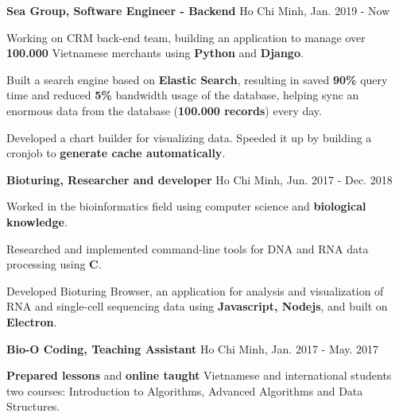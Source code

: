 

\begin{cventries}

  \cvsimpleentry
    {\textbf{Sea Group, Software Engineer - Backend}} %
    {Ho Chi Minh, Jan. 2019 - Now} %
    {
      \begin{cvitems} %
        \item {Working on CRM back-end team, building an application to manage over \textbf{100.000} Vietnamese merchants using \textbf{Python} and \textbf{Django}.}
        \item {Built a search engine based on \textbf{Elastic Search}, resulting in saved \textbf{90\%} query time and reduced \textbf{5\%} bandwidth usage of the database, helping sync an enormous data from the database (\textbf{100.000 records}) every day.}
        \item {Developed a chart builder for visualizing data. Speeded it up by building a cronjob to \textbf{generate cache automatically}.}
      \end{cvitems}
    }

  \cvsimpleentry
    {\textbf{Bioturing, Researcher and developer}} %
    {Ho Chi Minh, Jun. 2017 - Dec. 2018} %
    {
      \begin{cvitems} %
        \item {Worked in the bioinformatics field using computer science and \textbf{biological knowledge}.}
        \item {Researched and implemented command-line tools for DNA and RNA data processing using \textbf{C}.}
        \item {Developed Bioturing Browser, an application for analysis and visualization of RNA and single-cell sequencing data using \textbf{Javascript, Nodejs}, and built on \textbf{Electron}.}
      \end{cvitems}
    }

  \cvsimpleentry
    {\textbf{Bio-O Coding, Teaching Assistant}} %
    {Ho Chi Minh, Jan. 2017 - May. 2017} %
    {
      \begin{cvitems} %
        \item {\textbf{Prepared lessons} and \textbf{online taught} Vietnamese and international students two courses: Introduction to Algorithms, Advanced Algorithms and Data Structures.}
      \end{cvitems}
    }

\end{cventries}
